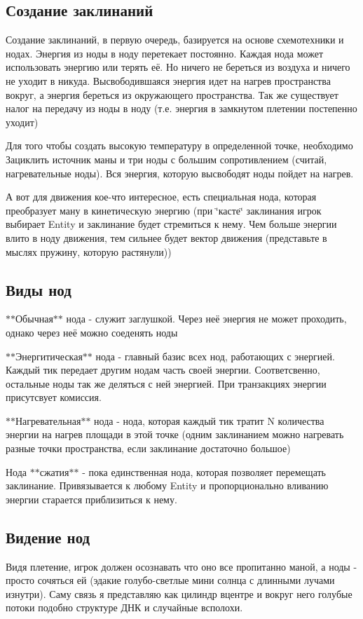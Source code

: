 \subsection*{Создание заклинаний}

Создание заклинаний, в первую очередь, базируется на основе схемотехники и нодах. Энергия из ноды в ноду перетекает постоянно. Каждая нода может использовать энергию или терять её. Но ничего не береться из воздуха и ничего не уходит в никуда. Высвободившаяся энергия идет на нагрев пространства вокруг, а энергия береться из окружающего пространства. Так же существует налог на передачу из ноды в ноду (т.\-е. энергия в замкнутом плетении постепенно уходит)

Для того чтобы создать высокую температуру в определенной точке, необходимо Зациклить источник маны и три ноды с большим сопротивлением (считай, нагревательные ноды). Вся энергия, которую высвободят ноды пойдет на нагрев.

А вот для движения кое-\/что интересное, есть специальная нода, которая преобразует ману в кинетическую энергию (при \char`\"{}касте\char`\"{} заклинания игрок выбирает Entity и заклинание будет стремиться к нему. Чем больше энергии влито в ноду движения, тем сильнее будет вектор движения (представьте в мыслях пружину, которую растянули))

\subsection*{Виды нод}


\begin{DoxyItemize}
\item $\ast$$\ast$Обычная$\ast$$\ast$ нода -\/ служит заглушкой. Через неё энергия не может проходить, однако через неё можно соеденять ноды
\item $\ast$$\ast$Энергитическая$\ast$$\ast$ нода -\/ главный базис всех нод, работающих с энергией. Каждый тик передает другим нодам часть своей энергии. Соответсвенно, остальные ноды так же деляться с ней энергией. При транзакциях энергии присутсвует комиссия.
\item $\ast$$\ast$Нагревательная$\ast$$\ast$ нода -\/ нода, которая каждый тик тратит N количества энергии на нагрев площади в этой точке (одним заклинанием можно нагревать разные точки пространства, если заклинание достаточно большое)
\item Нода $\ast$$\ast$сжатия$\ast$$\ast$ -\/ пока единственная нода, которая позволяет перемещать заклинание. Привязывается к любому Entity и пропорционально вливанию энергии старается приблизиться к нему. \subsection*{Видение нод}
\end{DoxyItemize}

Видя плетение, игрок должен осознавать что оно все пропитанно маной, а ноды -\/ просто сочяться ей (эдакие голубо-\/светлые мини солнца с длинными лучами изнутри). Саму связь я представляю как цилиндр вцентре и вокруг него голубые потоки подобно структуре ДНК и случайные всполохи. 